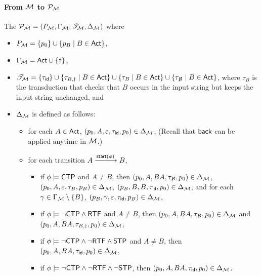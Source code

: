 \paragraph*{From ${\mathcal{M} }$ to ${\mathcal{P} }_{\mathcal{M} }$} 
The {\WOTrPDS} ${\mathcal{P} }_{\mathcal{M} } = (P_{\mathcal{M} }, \Gamma_{\mathcal{M} }, {\mathscr{T} }_{\mathcal{M} }, \Delta_{\mathcal{M} })$ where 
\begin{itemize}
\item $P_{{\mathcal{M} }} = \{p_0\}\cup\{ p_{B}\mid B\in{\sf Act}\}$,
\item $\Gamma_{{\mathcal{M} }} = {\sf Act} \cup \{\dag\}$, 
\item ${\mathscr{T} }_{\mathcal{M} } = \{\tau_{\mathsf{id}} \}\cup \{\tau_{B, \dag} \mid B \in {\sf Act}\} \cup \{\tau_{B} \mid B \in {\sf Act}\}  \cup \{\tau_{\not B} \mid B \in {\sf Act}\}$, where $\tau_B$ is the transduction that checks that $B$ occurs in the input string but keeps the input string unchanged, and 
\item $\Delta_{{\mathcal{M} }}$ is defined as follows:
        \begin{itemize}
            \item for each $A \in {\sf Act}$, $(p_0, A, \varepsilon, \tau_{\mathsf{id}}, p_0) \in \Delta_{{\mathcal{M} }}$, (Recall that ${\mathsf{back} }$ can be applied anytime in ${\mathcal{M} }$.)
			\item for each transition $A \xrightarrow{{\mathsf{start} }(\phi)} B$, 
			\begin{itemize}
				\item if $\phi \models {\sf CTP}$ and $A \neq B$, then $(p_0, A, BA, \tau_{\not B}, p_0) \in \Delta_{{\mathcal{M} }}$, $(p_0, A, \varepsilon, \tau_{B}, p_B) \in \Delta_{{\mathcal{M} }}$, $(p_B, B, B, \tau_{\mathsf{id}}, p_0)  \in \Delta_{{\mathcal{M} }}$, and for each $\gamma \in \Gamma_{\mathcal{M} } \setminus \{B\}$, $(p_B, \gamma, \varepsilon, \tau_{\mathsf{id}}, p_B) \in \Delta_{{\mathcal{M} }}$, 
%
				\item if $\phi\models \neg{\sf CTP} \wedge {\sf RTF}$ and $A \neq B$, then $(p_0, A, BA, \tau_{\not B}, p_0) \in \Delta_{{\mathcal{M} }}$ 
                and $(p_0, A, BA, \tau_{B, \dag}, p_0) \in \Delta_{{\mathcal{M} }}$,
				\item if $\phi \models \neg{\sf CTP} \wedge \neg {\sf RTF} \wedge {\sf STP}$ and $A \neq B$, then $(p_0, A, BA, \tau_{\mathsf{id}}, p_0) \in \Delta_{{\mathcal{M} }}$,
%
				\item if $\phi \models \neg{\sf CTP} \wedge \neg {\sf RTF} \wedge \neg {\sf STP}$, then $(p_0, A, BA, \tau_{\mathsf{id}}, p_0) \in \Delta_{{\mathcal{M} }}$.
			\end{itemize}
        \end{itemize}
\end{itemize}

